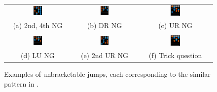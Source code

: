 \documentclass[10pt]{sigplanconf}
\begin{document}
\begin{figure}[t]
	\begin{center}
	\begin{tabular}{ccc}
		\includegraphics[width=0.14\textwidth]{test-basic-no.png} &
		\includegraphics[width=0.14\textwidth]{test-footswitch-bracket-no.png} &
		\includegraphics[width=0.14\textwidth]{test-reset-footing-no.png} \\
		(a) 2nd, 4th NG
		&
		(b) DR NG
		&
		(c) UR NG
		\\
		\\
		\includegraphics[width=0.14\textwidth]{test-propagate-through-ud-no.png} &
		\includegraphics[width=0.14\textwidth]{test-reset-subsequent-stream-no.png} &
		\includegraphics[width=0.14\textwidth]{test-footswitch-jack-also-yes.png} \\
		(d) LU NG
		&
		(e) 2nd UR NG
		&
		(f) Trick question
	\end{tabular}
	\end{center}
	\caption{Examples of unbracketable jumps,
	each corresponding to the similar pattern in .}
	\label{fig:tests2}
\end{figure}
\end{document}
